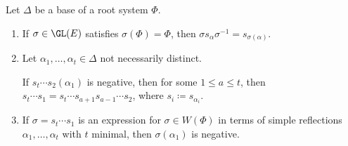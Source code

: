 Let $\Delta$ be a base of a root system $\Phi$.
\begin{enumerate}[label=(\alph*)]
	\item If $\sigma \in \GL(E)$ satisfies $\sigma(\Phi) = \Phi$, then
		$\sigma s_\alpha \sigma^{-1} = s_{\sigma(\alpha)}$.
	\item Let $\alpha_1, \ldots, \alpha_t \in \Delta$ not necessarily
		distinct.

		If $s_t\cdots s_2(\alpha_1)$ is negative, then for some $1\leq a\leq t$,
		then $s_t\cdots s_1 = s_t\cdots s_{a+1}s_{a-1}\cdots s_2$,
		where $s_i\coloneqq s_{\alpha_i}$.

	\item If $\sigma = s_t\cdots s_1$ is an expression for $\sigma \in W(\Phi)$
		in terms of simple reflections $\alpha_1, \ldots, \alpha_t$ with
		$t$ minimal, then $\sigma(\alpha_1)$ is negative.
\end{enumerate}
